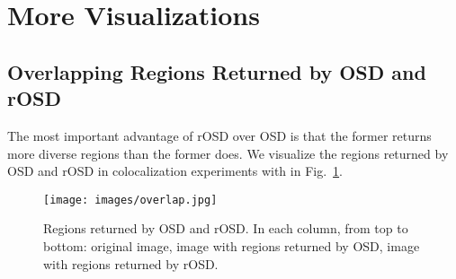 \documentclass[runningheads]{llncs}
\begin{document}
\begin{table}[tb]
    \centering
    \caption{\small Colocalization and single-object discovery performance of rOSD compared to OSD, Li {\em et al.}~\cite{Li2016mimick} and  Wei {\em et al.}~\cite{Wei2019ddtplus} on 6 \textit{held-out} ImageNet classes}
    \label{table:imagenet}
    \vspace{-10pt}
\end{table}

\section{More Visualizations}
\subsection{Overlapping Regions Returned by OSD and rOSD}
The most important advantage of rOSD over OSD is that the former returns more diverse regions than the former does. We visualize the regions returned by OSD and rOSD in colocalization experiments with  in Fig.~\ref{fig:overlap}. 
\begin{figure}[htb]
    \centering
    \parbox[t][][t]{\linewidth}{
    \vspace{-0.7cm}
    \texttt{[image: images/overlap.jpg]}
    }
	\caption{\small Regions returned by OSD and rOSD. In each column, from top to bottom: original image, image with regions returned by OSD, image with regions returned by rOSD.}
	\label{fig:overlap}
\end{figure}
\end{document}
